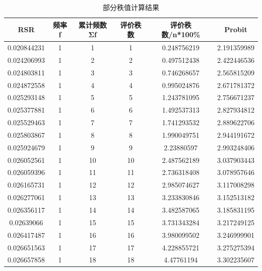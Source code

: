 \documentclass[UTF8]{ctexart}
\begin{document}
\begin{center}
\begin{longtable}{|c|c|c|c|c|c|}
	\caption{部分秩值计算结果}
		\label{tab:dasfa}  \\
		\hline
		RSR         & 频率f & 累计频数Σf & 评价秩数 & 评价秩数/n*100\% & Probit      \\ \hline
		0.020844231 & 1     & 1          & 1        & 0.248756219      & 2.191359989 \\ \hline
		0.024206993 & 1     & 2          & 2        & 0.497512438      & 2.422446536 \\ \hline
		0.024803811 & 1     & 3          & 3        & 0.746268657      & 2.565815209 \\ \hline
		0.024872558 & 1     & 4          & 4        & 0.995024876      & 2.671781372 \\ \hline
		0.025293148 & 1     & 5          & 5        & 1.243781095      & 2.756671237 \\ \hline
		0.025377881 & 1     & 6          & 6        & 1.492537313      & 2.827934812 \\ \hline
		0.025529463 & 1     & 7          & 7        & 1.741293532      & 2.889622706 \\ \hline
		0.025803867 & 1     & 8          & 8        & 1.990049751      & 2.944191672 \\ \hline
		0.025924679 & 1     & 9          & 9        & 2.23880597       & 2.993248406 \\ \hline
		0.026052561 & 1     & 10         & 10       & 2.487562189      & 3.037903443 \\ \hline
		0.026059396 & 1     & 11         & 11       & 2.736318408      & 3.078957646 \\ \hline
		0.026165731 & 1     & 12         & 12       & 2.985074627      & 3.117008298 \\ \hline
		0.026277061 & 1     & 13         & 13       & 3.233830846      & 3.152513182 \\ \hline
		0.026356117 & 1     & 14         & 14       & 3.482587065      & 3.185831195 \\ \hline
		0.02639066  & 1     & 15         & 15       & 3.731343284      & 3.217249125 \\ \hline
		0.026417487 & 1     & 16         & 16       & 3.980099502      & 3.246999901 \\ \hline
		0.026651563 & 1     & 17         & 17       & 4.228855721      & 3.275275394 \\ \hline
		0.026657858 & 1     & 18         & 18       & 4.47761194       & 3.302235607 \\ \hline

\end{longtable}
\end{center}
\end{document}
